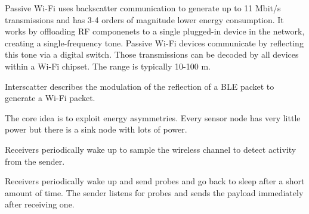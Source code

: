 \begin{mytitle}[Passive Wi-Fi] Passive Wi-Fi uses backscatter communication to generate up to 11 Mbit/s transmissions and has 3-4 orders of magnitude lower energy consumption. It works by offloading RF componenets to a single plugged-in device in the network, creating a single-frequency tone. Passive Wi-Fi devices communicate by reflecting this tone via a digital switch. Those transmissions can be decoded by all devices within a Wi-Fi chipset. The range is typically 10-100 m.
\end{mytitle}
\begin{mytitle}[Interscatter] Interscatter describes the modulation of the reflection of a BLE packet to generate a Wi-Fi packet.
\end{mytitle}
\begin{mytitle} The core idea is to exploit energy asymmetries. Every sensor node has very little power but there is a sink node with lots of power.
    \begin{mysubtitle} Receivers periodically wake up to sample the wireless channel to detect activity from the sender.
    \end{mysubtitle}
    \begin{mysubtitle} Receivers periodically wake up and send probes and go back to sleep after a short amount of time. The sender listens for probes and sends the payload immediately after receiving one.
    \end{mysubtitle}
\end{mytitle}
